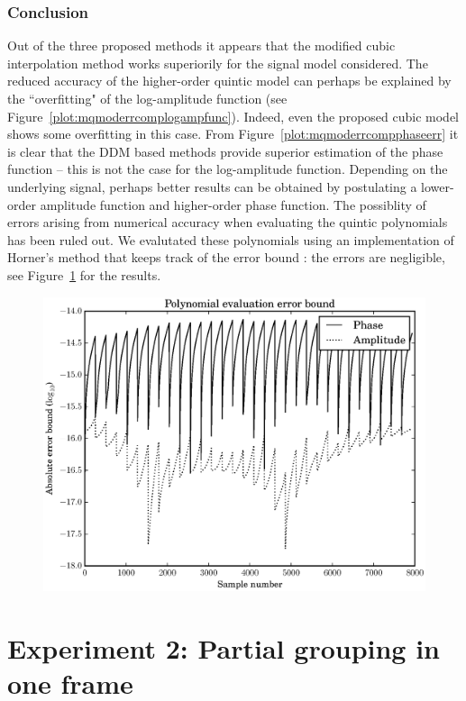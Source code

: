 \documentclass[letterpaper,12pt]{report}
\begin{document}
\subsubsection{Conclusion}

Out of the three proposed methods it appears that the modified cubic
interpolation method works superiorily for the signal model considered. The
reduced accuracy of the higher-order quintic model can perhaps be explained by
the ``overfitting" of the log-amplitude function (see
Figure~\ref{plot:mqmoderrcomplogampfunc}). Indeed, even the proposed cubic model
shows some overfitting in this case. From Figure~\ref{plot:mqmoderrcompphaseerr}
it is clear that the DDM based methods provide superior estimation of the phase
function -- this is not the case for the log-amplitude function. Depending on
the underlying signal, perhaps better results can be obtained by postulating a
lower-order amplitude function and higher-order phase function. The possiblity
of errors arising from numerical accuracy when evaluating the quintic
polynomials has been ruled out. We evalutated these polynomials using an
implementation of Horner's method that keeps track of the error bound
\cite[p.~95]{higham2002accuracy}: the
errors are negligible, see Figure~\ref{plot:mqmodquinticpolyevalerr} for the
results.

\begin{figure}
    \includegraphics[width=\textwidth]{plots/mq_mod_quintic_poly_eval_err.eps}
    \caption{\label{plot:mqmodquinticpolyevalerr}}
\end{figure}

\section{Experiment 2: Partial grouping in one frame}
\end{document}
